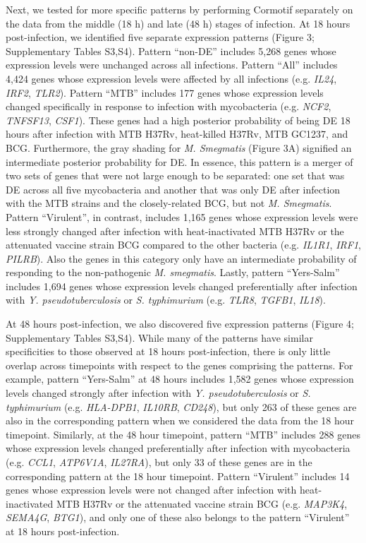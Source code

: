 Next, we tested for more specific patterns by performing Cormotif
separately on the data from the middle (18 h) and late (48 h) stages of
infection. At 18 hours post-infection, we identified five separate
expression patterns (Figure 3; Supplementary Tables S3,S4). Pattern
``non-DE'' includes 5,268 genes whose expression levels were unchanged
across all infections. Pattern ``All'' includes 4,424 genes whose
expression levels were affected by all infections (e.g. \emph{IL24},
\emph{IRF2}, \emph{TLR2}). Pattern ``MTB'' includes 177 genes whose
expression levels changed specifically in response to infection with
mycobacteria (e.g. \emph{NCF2}, \emph{TNFSF13}, \emph{CSF1}). These
genes had a high posterior probability of being DE 18 hours after
infection with MTB H37Rv, heat-killed H37Rv, MTB GC1237, and BCG.
Furthermore, the gray shading for \emph{M. Smegmatis} (Figure 3A)
signified an intermediate posterior probability for DE. In essence, this
pattern is a merger of two sets of genes that were not large enough to
be separated: one set that was DE across all five mycobacteria and
another that was only DE after infection with the MTB strains and the
closely-related BCG, but not \emph{M. Smegmatis}. Pattern ``Virulent'',
in contrast, includes 1,165 genes whose expression levels were less
strongly changed after infection with heat-inactivated MTB H37Rv or the
attenuated vaccine strain BCG compared to the other bacteria (e.g.
\emph{IL1R1}, \emph{IRF1}, \emph{PILRB}). Also the genes in this
category only have an intermediate probability of responding to the
non-pathogenic \emph{M. smegmatis}. Lastly, pattern ``Yers-Salm''
includes 1,694 genes whose expression levels changed preferentially
after infection with \emph{Y. pseudotuberculosis} or \emph{S.
typhimurium} (e.g. \emph{TLR8}, \emph{TGFB1}, \emph{IL18}).

At 48 hours post-infection, we also discovered five expression patterns
(Figure 4; Supplementary Tables S3,S4). While many of the patterns have
similar specificities to those observed at 18 hours post-infection,
there is only little overlap across timepoints with respect to the genes
comprising the patterns. For example, pattern ``Yers-Salm'' at 48 hours
includes 1,582 genes whose expression levels changed strongly after
infection with \emph{Y. pseudotuberculosis} or \emph{S. typhimurium}
(e.g. \emph{HLA-DPB1}, \emph{IL10RB}, \emph{CD248}), but only 263 of
these genes are also in the corresponding pattern when we considered the
data from the 18 hour timepoint. Similarly, at the 48 hour timepoint,
pattern ``MTB'' includes 288 genes whose expression levels changed
preferentially after infection with mycobacteria (e.g. \emph{CCL1},
\emph{ATP6V1A}, \emph{IL27RA}), but only 33 of these genes are in the
corresponding pattern at the 18 hour timepoint. Pattern ``Virulent''
includes 14 genes whose expression levels were not changed after
infection with heat-inactivated MTB H37Rv or the attenuated vaccine
strain BCG (e.g. \emph{MAP3K4}, \emph{SEMA4G}, \emph{BTG1}), and only
one of these also belongs to the pattern ``Virulent'' at 18 hours
post-infection.

